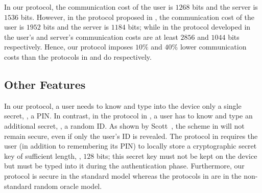 In our protocol, the communication cost of the user is $1268$ bits and the server is $1536$ bits. However, in the protocol proposed in \cite{WangW18},  the communication cost of the user is $1952$ bits and the server is  $1184$ bits; while in the protocol developed in \cite{JareckiJKSS21} the user's and server's communication costs are at least $2856$ and $1044$ bits respectively. Hence, our protocol imposes $10\%$ and $40\%$ lower communication costs than the protocols in \cite{WangW18} and \cite{JareckiJKSS21} do respectively.


\subsection{Other Features}
 In our protocol, a user needs to know and type into the device only a single secret, \ie, a PIN. In contrast, in the protocol in \cite{WangW18}, a user has to know and type an additional secret, \ie, a random ID. As shown by Scott~\cite{Scott12a}, the scheme in \cite{WangW18} will not remain secure, even if only the user's ID is revealed. The protocol in \cite{JareckiJKSS21} requires the user (in addition to remembering its PIN) to locally store a cryptographic secret key of sufficient length, \eg, $128$ bits; this secret key must not be kept on the device but must be typed into it during the authentication phase. 
 Furthermore, our protocol is secure in the standard model whereas the protocols in \cite{WangW18,JareckiJKSS21} are in the non-standard random oracle model. 


